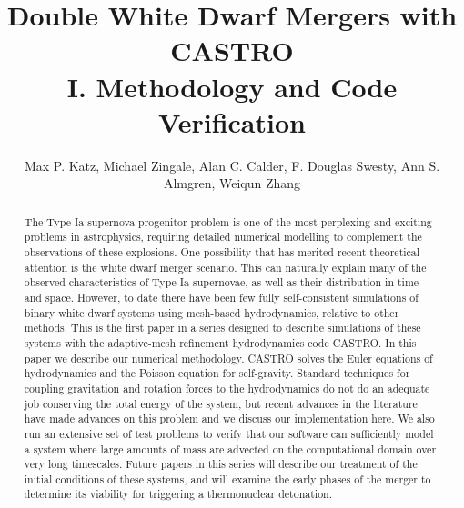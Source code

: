 \documentclass{emulateapj}
\begin{document}
\title{Double White Dwarf Mergers with CASTRO\\ I. Methodology and Code 
       Verification}


\author{Max P. Katz, Michael Zingale, Alan C. Calder, F. Douglas Swesty, Ann S. Almgren, Weiqun Zhang}
\begin{abstract}
The Type Ia supernova progenitor problem is one of the most perplexing and 
exciting problems in astrophysics, requiring detailed numerical modelling to 
complement the observations of these explosions. One possibility that has 
merited recent theoretical attention is the white dwarf merger scenario.
This can naturally explain many of the observed characteristics of 
Type Ia supernovae, as well as their distribution in time and space.
However, to date there have been few fully self-consistent simulations 
of binary white dwarf systems using mesh-based hydrodynamics, 
relative to other methods. This is the first paper in a series designed to 
describe simulations of these systems with the adaptive-mesh refinement 
hydrodynamics code CASTRO. In this paper we describe our numerical 
methodology. CASTRO solves the Euler equations of hydrodynamics 
and the Poisson equation for self-gravity. Standard techniques for 
coupling gravitation and rotation forces to the hydrodynamics do 
not do an adequate job conserving the total energy of the system, 
but recent advances in the literature have made advances on this 
problem and we discuss our implementation here. We also run an 
extensive set of test problems to verify that our software can sufficiently
model a system where large amounts of mass are advected on the computational 
domain over very long timescales. Future papers in this series will describe
our treatment of the initial conditions of these systems, and will 
examine the early phases of the merger to determine its viability
for triggering a thermonuclear detonation.

\end{abstract}

\end{document}
